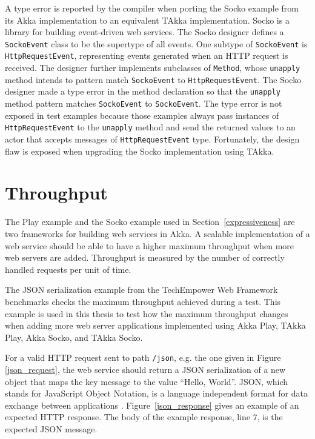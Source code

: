 A type error is reported by the compiler when porting the Socko example 
\citep{SOCKO} from its Akka implementation to an equivalent TAkka 
implementation.
Socko is a library for building event-driven web services.  The Socko designer
defines a {\tt SockoEvent} class to be the supertype of all events.  One
subtype of {\tt SockoEvent} is {\tt HttpRequestEvent}, representing events
generated when an HTTP request is received. The designer further implements
subclasses of {\tt Method}, whose {\tt unapply} method intends to pattern
match {\tt SockoEvent} to {\tt HttpRequestEvent}.  The Socko
designer made a type error in the method declaration so that the {\tt unapply}
method pattern matches {\tt SockoEvent} to {\tt SockoEvent}. The type error is
not exposed in test examples because those examples always pass instances 
of {\tt HttpRequestEvent} to the {\tt unapply} method and send the returned
values to an actor that accepts messages of {\tt HttpRequestEvent} type.
Fortunately, the design flaw is exposed when upgrading the Socko implementation 
using TAkka.



\section{Throughput}
\label{throughput}

The Play example \citep{play_doc} and the Socko example \citep{SOCKO} used in 
Section~\ref{expressiveness} are two frameworks for building web services in 
Akka.  A scalable implementation of a web service should be able to have 
a higher maximum throughput when more web servers are added.  Throughput is 
measured by the number of correctly handled requests per unit of time.

The JSON serialization example from the TechEmpower Web Framework benchmarks 
\citep{techempower} checks the maximum throughput achieved during a test.  This 
example is used in this thesis to test how the maximum throughput changes when 
adding more web server applications implemented using Akka Play, TAkka 
Play, Akka Socko, and TAkka Socko.  

For a valid HTTP request sent to path {\tt /json}, e.g. the one given in Figure 
\ref{json_request}, the web service should return a JSON serialization of a new 
object that maps the key message to the value ``Hello, World''.  JSON, which 
stands for JavaScript Object Notation, is a language independent format for 
data exchange between applications \citep{json}.  Figure~\ref{json_response} 
gives an example of an expected HTTP response.  The body of the example 
response, line 7, is the expected JSON message.



